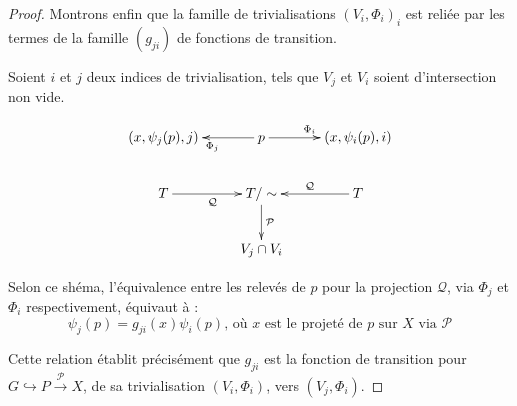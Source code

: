 \begin{proof}
\par
Montrons enfin que la famille de trivialisations $(V_i,\Phi_i)_i$ est reliée par les termes de la famille $(g_{ji})$ de fonctions de transition.

\par
Soient $i$ et $j$ deux indices de trivialisation, tels que $V_j$ et $V_i$ soient d'intersection non vide.

\[\xymatrix{(x,\psi_j(p),j) & \ar[l]^{\Phi_j} p \ar[r]^{\Phi_i} & (x,\psi_i(p),i) \\%
T \ar[r]_{\mathcal{Q}} & T/\sim \ar[d]^{\mathcal{P}} & \ar[l]_{\mathcal{Q}} T \\ & V_j \cap V_i & }\]

Selon ce shéma, l'équivalence entre les relevés de $p$ pour la projection $\mathcal{Q}$, via $\Phi_j$ et $\Phi_i$ respectivement, équivaut à :
\[\psi_j(p) = g_{ji}(x) \psi_i(p)\text{, où $x$ est le projeté de $p$ sur $X$ via $\mathcal{P}$}\]

Cette relation établit précisément que $g_{ji}$ est la fonction de transition pour $G \hookrightarrow P \xrightarrow{\mathcal{P}} X$, %
de sa trivialisation $(V_i,\Phi_i)$, vers $(V_j,\Phi_i)$.
\end{proof}
